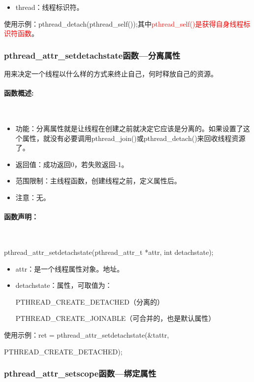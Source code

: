 \documentclass[UTF8]{article}%
\begin{document}
\begin{itemize}
    \item thread：线程标识符。
\end{itemize}

使用示例：pthread\_detach(pthread\_self());其中\textcolor{red}{pthread\_self()是获得自身线程标识符函数}。

\subsubsection{pthread\_attr\_setdetachstate函数---分离属性}

用来决定一个线程以什么样的方式来终止自己，何时释放自己的资源。

\paragraph{函数概述:}~{}

\begin{itemize}
    \item 功能：分离属性就是让线程在创建之前就决定它应该是分离的。如果设置了这个属性，就没有必要调用pthread\_join()或pthread\_detach()来回收线程资源了。 
    \item 返回值：成功返回0，若失败返回-1。
    \item 范围限制：主线程函数，创建线程之前，定义属性后。
    \item 注意：无。
\end{itemize}

\paragraph{函数声明：}~{}

pthread\_attr\_setdetachstate(pthread\_attr\_t *attr, int detachstate); 

\begin{itemize}
    \item attr：是一个线程属性对象。地址。
    \item detachstate：属性，可取值为：
    
    PTHREAD\_CREATE\_DETACHED（分离的）
    
    PTHREAD\_CREATE\_JOINABLE（可合并的，也是默认属性）

\end{itemize}

使用示例：ret = pthread\_attr\_setdetachstate(\&tattr,

PTHREAD\_CREATE\_DETACHED);

\subsubsection{pthread\_attr\_setscope函数---绑定属性}
\end{document}
